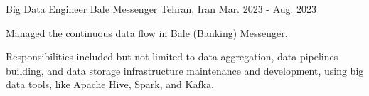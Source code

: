 

\begin{cventries}

  \cventry
    {Big Data Engineer} %
    {\href{https://bale.ai/}{Bale Messenger}} %
    {Tehran, Iran} %
    {Mar. 2023 - Aug. 2023} %
    {
      \begin{cvitems} %
        \item {Managed the continuous data flow in Bale (Banking) Messenger.}
        \item {Responsibilities included but not limited to data aggregation, data pipelines building, and data storage infrastructure maintenance and development, using big data tools, like Apache Hive, Spark, and Kafka.}
      \end{cvitems}
    }



\end{cventries}
